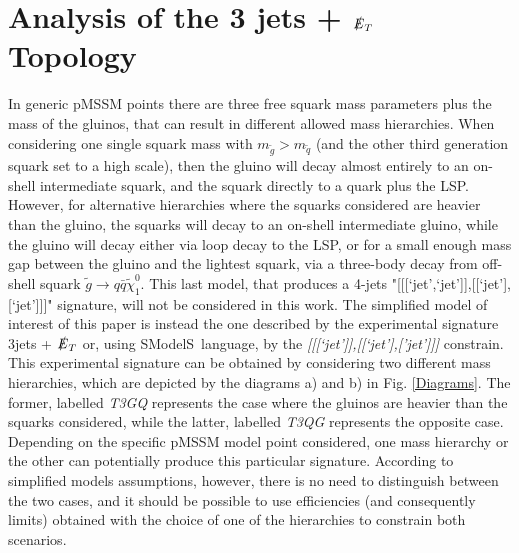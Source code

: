 \documentclass[a4paper,11pt]{article}
\newcommand{\SMO}{{\sc SModelS}}
\begin{document}
\section{Analysis of the 3 jets + $\slashed{E}_T$ Topology}\label{sec::T3GQ}
In generic pMSSM points there are three free squark mass parameters plus the mass of the gluinos, that can result in different allowed mass hierarchies. When considering one single squark mass with $m_{\tilde g} > m_{\tilde q}$ (and the other third generation squark set to a high scale), then the gluino will decay almost entirely to an on-shell intermediate squark, and the squark directly to a quark plus the LSP. However, for alternative hierarchies where the squarks considered are heavier than the gluino, the squarks will decay to an on-shell intermediate gluino, while the gluino will decay either via loop decay to the LSP, or for a small enough mass gap between the gluino and the lightest squark, via a three-body decay from off-shell squark $\tilde g \rightarrow q \bar q \tilde \chi _1 ^0$. This last model, that produces a 4-jets "[[[`jet',`jet']],[[`jet'],[`jet']]]" signature, will not be considered in this work. The simplified model of interest of this paper is instead the one described by the experimental signature 3jets + $\slashed{E}_T$ or, using \SMO~language, by the \textit{[[[`jet']],[[`jet'],['jet']]]} constrain. This experimental signature can be obtained by considering two different mass hierarchies, which are depicted by the diagrams a) and b) in Fig. \ref{Diagrams}. The former, labelled \textit{T3GQ} represents the case where the gluinos are heavier than the squarks considered, while the latter, labelled \textit{T3QG} represents the opposite case. Depending on the specific pMSSM model point considered, one mass hierarchy or the other can potentially produce this particular signature. According to simplified models assumptions, however, there is no need to distinguish between the two cases, and it should be possible to use efficiencies (and consequently limits) obtained with the choice of one of the hierarchies to constrain both scenarios. 
%
\end{document}
